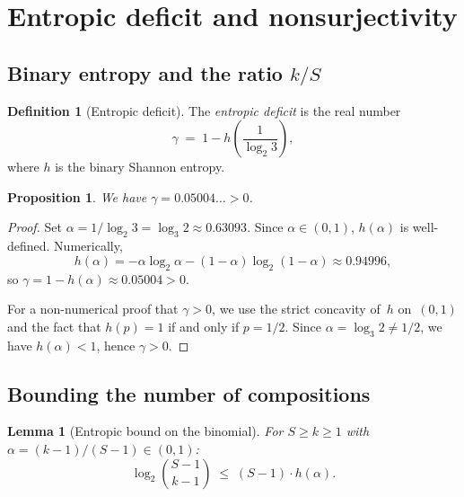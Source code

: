 \documentclass[12pt, a4paper]{amsart}
\theoremstyle{plain}
\newtheorem{proposition}[theorem]{Proposition}
\newtheorem{lemma}[theorem]{Lemma}
\theoremstyle{definition}
\newtheorem{definition}[theorem]{Definition}
\theoremstyle{remark}
\begin{document}
\section{Entropic deficit and nonsurjectivity}%
\label{sec:entropy}

\subsection{Binary entropy and the ratio $k/S$}

\begin{definition}[Entropic deficit]\label{def:deficit}
  The \emph{entropic deficit} is the real number
  \begin{equation}\label{eq:gamma}
    \gamma \;=\; 1 - h\!\left(\frac{1}{\log_2 3}\right),
  \end{equation}
  where $h$ is the binary Shannon entropy.
\end{definition}

\begin{proposition}\label{prop:gamma-value}
  We have $\gamma = 0.05004\ldots > 0$.
\end{proposition}

\begin{proof}
  Set $\alpha = 1/\log_2 3 = \log_3 2 \approx 0.63093$.
  Since $\alpha \in (0,1)$, $h(\alpha)$ is well-defined.
  Numerically,
  \[
    h(\alpha) = -\alpha \log_2 \alpha - (1-\alpha) \log_2(1-\alpha)
    \approx 0.94996,
  \]
  so $\gamma = 1 - h(\alpha) \approx 0.05004 > 0$.

  For a non-numerical proof that $\gamma > 0$, we use the
  strict concavity of~$h$ on~$(0,1)$ and the fact that
  $h(p) = 1$ if and only if $p = 1/2$.
  Since $\alpha = \log_3 2 \neq 1/2$, we have $h(\alpha) < 1$,
  hence $\gamma > 0$.
\end{proof}

\subsection{Bounding the number of compositions}

\begin{lemma}[Entropic bound on the binomial]%
\label{lem:binomial-entropy}
  For $S \geq k \geq 1$ with $\alpha = (k-1)/(S-1) \in (0,1)$:
  \begin{equation}\label{eq:binomial-bound}
    \log_2 \binom{S-1}{k-1}
    \;\leq\; (S-1) \cdot h(\alpha).
  \end{equation}
\end{lemma}
\end{document}
